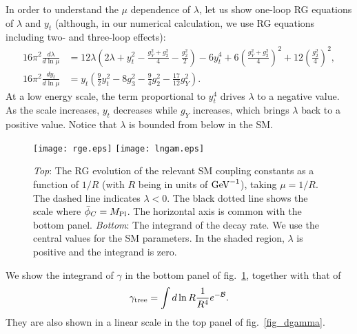 \documentclass[12pt]{article}
\begin{document}
In order to understand the $\mu$ dependence of $\lambda$, let us show
one-loop RG equations of $\lambda$ and $y_t$ (although, in our
numerical calculation, we use RG equations including two- and
three-loop effects):
\begin{align}
 16\pi^2\frac{d\lambda}{d\ln\mu}
  & = 12\lambda
 \left(
  2\lambda+y_t^2-\frac{g_Y^2+g_2^2}{4}-\frac{g_2^2}{2}
 \right)-6y_t^4+6
 \left(
  \frac{g_Y^2+g_2^2}{4}
 \right)^2+12
 \left(
  \frac{g_2^2}{4}
 \right)^2,     \\
 16\pi^2\frac{dy_t}{d\ln\mu}
  & = y_t
 \left(
  \frac{9}{2}y_t^2-8g_3^2-\frac{9}{4}g_2^2-\frac{17}{12}g_Y^2
 \right).
\end{align}
At a low energy scale, the term proportional to $y_t^4$ drives
$\lambda$ to a negative value. As the scale increases, $y_t$ decreases
while $g_Y$ increases, which brings $\lambda$ back to a positive
value. Notice that $\lambda$ is bounded from below in the SM.

\begin{figure}[t]
 \begin{center}
  \hspace{0.8ex}\texttt{[image: rge.eps]}
  \texttt{[image: lngam.eps]}
\end{center}
\caption{{\it Top}: The RG evolution of the relevant SM coupling
  constants as a function of $1/R$ (with $R$ being in units of ${\rm
    GeV}^{-1}$), taking $\mu=1/R$.  The dashed line indicates
  $\lambda<0$. The black dotted line shows the scale where
  $\bar\phi_C=M_{\rm Pl}$. The horizontal axis is common with the
  bottom panel. {\it Bottom}: The integrand of the decay rate. We use
  the central values for the SM parameters. In the shaded region,
  $\lambda$ is positive and the integrand is zero.    }
 \label{fig_rge}
\end{figure}

We show the integrand of $\gamma$ in the bottom panel of fig.\
\ref{fig_rge}, together with that of
\begin{align}
 \gamma_{\rm tree} = \int d \ln R \frac{1}{R^4} e^{-\mathcal B}.
 \label{eq_treelevel}
\end{align}
They are also shown in a linear scale in the top panel of fig.\
\ref{fig_dgamma}.
\end{document}
